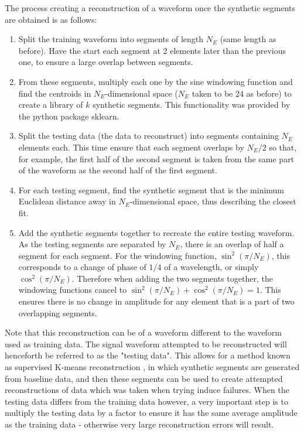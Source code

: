 The process creating a reconstruction of a waveform once the synthetic segments are obtained is as follows:

\begin{enumerate}
    \item Split the training waveform into segments of length $N_E$ (same length as before). Have the start each segment at 2 elements later than the previous one, to ensure a large overlap between segments.
    \item From these segments, multiply each one by the sine windowing function and find the centroids in $N_E$-dimensional space ($N_E$ taken to be 24 as before) to create a library of $k$ synthetic segments. This functionality was provided by the python package sklearn.
    \item Split the testing data (the data to reconstruct) into segments containing $N_E$ elements each. This time ensure that each segment overlaps by $N_E/2$ so that, for example, the first half of the second segment is taken from the same part of the waveform as the second half of the first segment.
    \item For each testing segment, find the synthetic segment that is the minimum Euclidean distance away in $N_E$-dimensional space, thus describing the closest fit. 
    \item Add the synthetic segments together to recreate the entire testing waveform. As the testing segments are separated by $N_E$, there is an overlap of half a segment for each segment. For the windowing function, $\sin^2(\pi/N_E)$, this corresponds to a change of phase of $1/4$ of a wavelength, or simply $\cos^2(\pi/N_E)$. Therefore when adding the two segments together, the windowing functions cancel to $\sin^2(\pi/N_E) + \cos^2(\pi/N_E) = 1$. This ensures there is no change in amplitude for any element that is a part of two overlapping segments.
\end{enumerate}


Note that this reconstruction can be of a waveform different to the waveform used as training data. The signal waveform attempted to be reconstructed will henceforth be referred to as the "testing data". This allows for a method known as supervised K-means reconstruction \cite{596afe3f2b5a4ff3b8f4f9793ad2f4ee}, in which synthetic segments are generated from baseline data, and then these segments can be used to create attempted reconstructions of data which was taken when trying induce failures. When the testing data differs from the training data however, a very important step is to multiply the testing data by a factor to ensure it has the same average amplitude as the training data - otherwise very large reconstruction errors will result.


